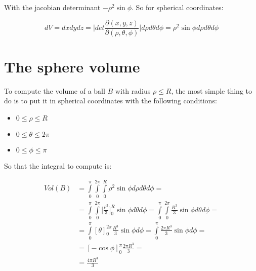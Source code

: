 With the jacobian determinant $-\rho^2\sin\phi$.
So for spherical coordinates:

$$dV = dxdydz = \biggl|det\frac{\partial(x,y,z)}{\partial(\rho,\theta,\phi)}\biggr|d\rho d\theta d\phi = \rho^2\sin\phi d\rho d\theta d\phi$$

\section{The sphere volume}
To compute the volume of a ball $B$ with radius $\rho\le R$, the most simple thing to do is to put it in spherical coordinates with the following conditions:

\begin{multicols}{3}
	\begin{itemize}
		\item $0\le \rho\le R$
		\item $0 \le \theta\le 2\pi$
		\item $0 \le \phi\le \pi$
	\end{itemize}
\end{multicols}

So that the integral to compute is:

\begin{align*}
	Vol(B) &= \int\limits_0^\pi\int\limits_0^{2\pi}\int\limits_{0}^R \rho^2\sin\phi d\rho d\theta d\phi=\\
				 &=\int\limits_0^\pi\int\limits_0^{2\pi}\biggl[\frac{\rho^3}{3}\biggr]_0^R\sin\phi d\theta d\phi = \int\limits_0^\pi\int\limits_0^{2\pi}\frac{R^3}{3}\sin\phi d\theta d\phi=\\
				 &=\int\limits_0^\pi[\theta]_0^{2\pi}\frac{R^3}{3}\sin\phi d\phi = \int\limits_0^\pi\frac{2\pi R^3}{3}\sin\phi d\phi = \\
				 &= [-\cos\phi]_0^\pi\frac{2\pi R^3}{3}=\\
				 &=\frac{4\pi R^3}{3}
\end{align*}
